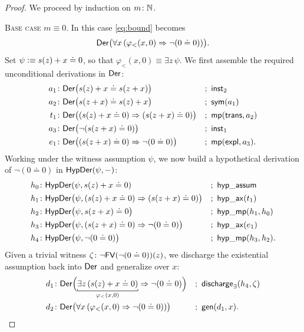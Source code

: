 \begin{proof}
    We proceed by induction on $m\colon\N$.

    \textsc{Base case $m\equiv 0$.} In this case \eqref{eq:bound} becomes
    \[
        \mathsf{Der}\bigl(
            \forall x\,(\varphi_{<}(x,0)\mathrel{\Rightarrow}\neg(0\doteq 0))
        \bigr).
    \]
    Set $\psi\mathrel{\vcentcolon}\equiv s(z)+x\doteq 0$, so that $\varphi_{<}(x,0)\equiv\exists z\,\psi$. We first assemble the required unconditional derivations in $\mathsf{Der}$:
    \begin{align*}
        a_1&\colon\fun{Der}\bigl(s(z)+x\doteq s(z+x)\bigr)
            &&;\ \fun{inst}_2\\
        a_2&\colon\fun{Der}\bigl(s(z+x)\doteq s(z)+x\bigr)
            &&;\ \fun{sym}(a_1)\\
        t_1&\colon\fun{Der}\bigl((s(z)+x\doteq 0)\imp(s(z+x)\doteq 0)\bigr)
            &&;\ \fun{mp}(\fun{trans},a_2)\\
        a_3&\colon\fun{Der}\bigl(\neg(s(z+x)\doteq 0)\bigr)
            &&;\ \fun{inst}_1\\
        e_1&\colon\fun{Der}\bigl((s(z+x)\doteq 0)\imp\neg(0\doteq 0)\bigr)
            &&;\ \fun{mp}(\fun{expl},a_3).
    \end{align*}
    Working under the witness assumption $\psi$, we now build a hypothetical derivation of $\neg(0\doteq 0)$ in $\mathsf{HypDer}(\psi,{\mathord-})$:
    \begin{align*}
        h_0&\colon\fun{HypDer}(\psi,s(z)+x\doteq0)
            &&;\ \fun{hyp\_assum}\\
        h_1&\colon\fun{HypDer}\bigl(
            \psi,(s(z)+x\doteq0)\imp(s(z+x)\doteq0)
        \bigr)
            &&;\ \fun{hyp\_ax}(t_1)\\
        h_2&\colon\fun{HypDer}\bigl(
            \psi,s(z+x)\doteq0
        \bigr)
            &&;\ \fun{hyp\_mp}(h_1,h_0)\\
        h_3&\colon\fun{HypDer}\bigl(
            \psi,(s(z+x)\doteq0)\imp\neg(0\doteq0)
        \bigr)
            &&;\ \fun{hyp\_ax}(e_1)\\
        h_4&\colon\fun{HypDer}\bigl(
            \psi,\neg(0\doteq0)
        \bigr)
            &&;\ \fun{hyp\_mp}(h_3,h_2).
    \end{align*}
    Given a trivial witness $\zeta\colon\neg\fun{FV}(\neg(0\doteq0))(z)$, we discharge the existential assumption back into $\mathsf{Der}$ and generalize over $x$:
    \begin{align*}
        d_1&\colon\fun{Der}\Bigl(
            \explain[\varphi_{<}(x,0)]{
                \exists z\,(s(z)+x\doteq 0)
            }
            \imp
            \neg(0\doteq 0)
        \Bigr)
            &&;\ \fun{discharge}_\exists(h_4,\zeta)\\
        d_2&\colon\fun{Der}\bigl(
            \forall x\,(\varphi_{<}(x,0)\imp\neg(0\doteq 0))
        \bigr)
            &&;\ \fun{gen}(d_1,x).
    \end{align*}    
    

\end{proof}
